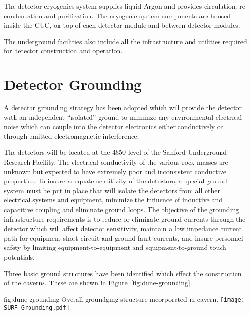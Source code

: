 The detector cryogenics system supplies liquid Argon and provides
circulation, re-condensation and purification. The cryogenic system
components are housed inside the CUC, on top of each detector module
and between detector modules.

The underground facilities also include all the infrastructure and
utilities required for detector construction and operation.

\section{Detector Grounding}
\label{sec:fdsp-coord-faci-grounding}

A detector grounding strategy has been adopted which will provide the
detector with an independent ``isolated'' ground to minimize any
environmental electrical noise which can couple into the detector
electronics either conductively or through emitted electromagnetic
interference.

The detectors will be located at the 4850 level of the Sanford
Underground Research Facility. The electrical conductivity of the
various rock masses are unknown but expected to have extremely poor
and inconsistent conductive properties. To insure adequate sensitivity
of the detectors, a special ground system must be put in place that
will isolate the detectors from all other electrical systems and
equipment, minimize the influence of inductive and capacitive coupling
and eliminate ground loops. The objective of the grounding
infrastructure requirements is to reduce or eliminate ground currents
through the detector which will affect detector sensitivity, maintain
a low impedance current path for equipment short circuit and ground
fault currents, and insure personnel safety by limiting
equipment-to-equipment and equipment-to-ground touch potentials.

Three basic ground structures have been identified which effect the
construction of the caverns.  These are shown in
Figure~\ref{fig:dune-grounding}.
\begin{dunefigure}{fig:dune-grounding}
  {Overall  groundging structure incorporated in cavern.}
  \texttt{[image: SURF\_Grounding.pdf]}
\end{dunefigure}

